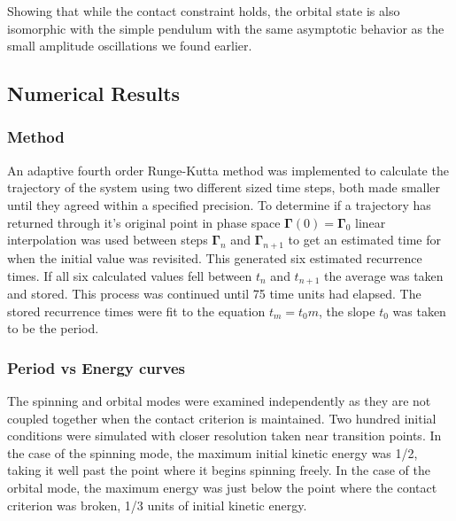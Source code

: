 \documentclass[prbg,preprint]{revtex4-1}
\begin{document}
Showing that while the contact constraint holds, the orbital state is also isomorphic with the simple pendulum with the same asymptotic behavior as the small amplitude oscillations we found earlier.

\subsection{Numerical Results}
\subsubsection{Method}
An adaptive fourth order Runge-Kutta method was implemented to calculate the trajectory of the system using two different sized time steps, both made smaller until they agreed within a specified precision. To determine if a trajectory has returned through it's original point in phase space $\boldsymbol{\Gamma}(0)=\boldsymbol{\Gamma}_0$ linear interpolation was used between steps $\boldsymbol{\Gamma}_n$ and $\boldsymbol{\Gamma}_{n+1}$ to get an estimated time for when the initial value was revisited. This generated six estimated recurrence times. If all six calculated values fell between $t_n$ and $t_{n+1}$ the average was taken and stored. This process was continued until 75 time units had elapsed. The stored recurrence times were fit to the equation $t_m = t_0m$, the slope $t_0$ was taken to be the period.

\subsubsection{Period vs Energy curves}
The spinning and orbital modes were examined independently as they are not coupled together when the contact criterion is maintained. Two hundred initial conditions were simulated with closer resolution taken near transition points. In the case of the spinning mode, the maximum initial kinetic energy was 1/2, taking it well past the point where it begins spinning freely. In the case of the orbital mode, the maximum energy was just below the point where the contact criterion was broken, 1/3 units of initial kinetic energy.
\end{document}
